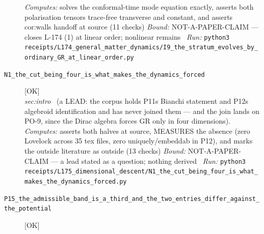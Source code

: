 \begin{description}
\emph{Computes:} solves the conformal-time mode equation exactly, asserts both polarisation tensors trace-free transverse and constant, and asserts cor:walls handoff at source (11 checks)
 \emph{Bound:} NOT-A-PAPER-CLAIM --- closes L-174 (1) at linear order; nonlinear remains
\ \emph{Run:} \texttt{python3 receipts/L174\_general\_matter\_dynamics/I9\_the\_stratum\_evolves\_by\_ordinary\_GR\_at\_linear\_order.py}
\item[\label{rcpt:N1_the_cut_being_four_is_what_makes_the_dynamics_forced}\texttt{N1\_the\_cut\_being\_four\_is\_what\_makes\_the\_dynamics\_forced}]\hfill\textsf{[OK]}\\
\textit{sec:intro} \ (a LEAD: the corpus holds P11s Bianchi statement and P12s algebroid identification and has never joined them --- and the join lands on PO-9, since the Dirac algebra forces GR only in four dimensions). 
\emph{Computes:} asserts both halves at source, MEASURES the absence (zero Lovelock across 35 tex files, zero uniquely/embeddab in P12), and marks the outside literature as outside (13 checks)
 \emph{Bound:} NOT-A-PAPER-CLAIM --- a lead stated as a question; nothing derived
\ \emph{Run:} \texttt{python3 receipts/L175\_dimensional\_descent/N1\_the\_cut\_being\_four\_is\_what\_makes\_the\_dynamics\_forced.py}
\item[\label{rcpt:P15_the_admissible_band_is_a_third_and_the_two_entries_differ_against_the_potential}\texttt{P15\_the\_admissible\_band\_is\_a\_third\_and\_the\_two\_entries\_differ\_against\_the\_potential}]\hfill\textsf{[OK]}\\

\end{description}
